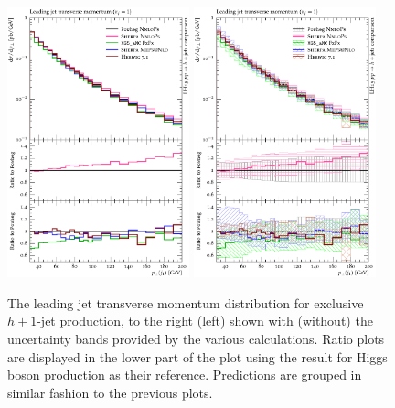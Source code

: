 \begin{figure}[t!]
  \centering
  \includegraphics[width=0.47\textwidth]{figures/hjetscomp_u_jet1_pT_excl.pdf}
  \hfill
  \includegraphics[width=0.47\textwidth]{figures/hjetscomp_jet1_pT_excl.pdf}
  \caption{\label{fig:hjetscomp:results:1obs:j1pt_excl}%
    The leading jet transverse momentum distribution for exclusive
    $h+1$-jet production, to the right (left) shown with (without)
    the uncertainty bands provided by the various calculations. Ratio
    plots are displayed in the lower part of the plot using the
    \Powheg \NNLOPS result for Higgs boson production as their
    reference. Predictions are grouped in similar fashion to the
    previous plots.}
\end{figure}

